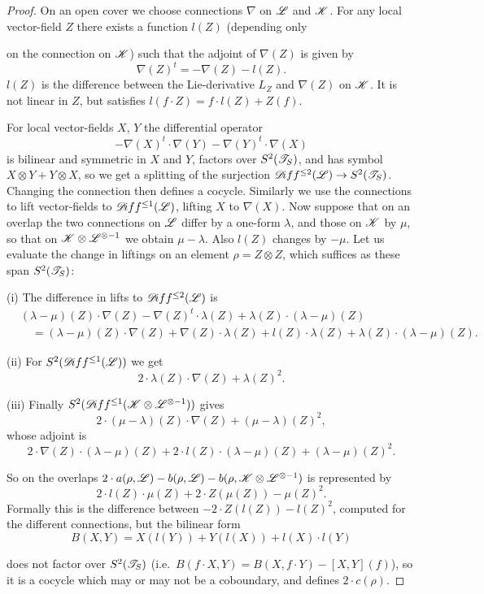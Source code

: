 \documentclass[12pt,english]{smfart}
\theoremstyle{plain} \newtheorem{innerthm}{Theorem} \newtheorem{innerlem}{Lemma} \newtheorem{innerprop}{Proposition} \newtheorem{innercor}{Corollary} \theoremstyle{definition} \newtheorem{innerdefn}{Definition} \newtheorem{innerconstr}{Construction} \theoremstyle{remark} \newtheorem*{remark}{Remark} \newtheorem*{remarks}{Remarks} \newtheorem*{applications}{Applications}
\begin{document}
\begin{proof}
On an open cover we choose connections $\nabla$ on $\mathscr{L}$ and $\mathscr{K}$. For any local vector-field $Z$ there exists a function $l(Z)$ (depending only


on the connection on $\mathscr{K}$) such that the adjoint of $\nabla(Z)$ is given by
\[
\nabla(Z)^t=-\nabla(Z)-l(Z).
\]
$l(Z)$ is the difference between the Lie-derivative $L_Z$ and $\nabla(Z)$ on $\mathscr{K}$. It is not linear in $Z$, but satisfies $l(f\cdot Z)=f\cdot l(Z)+Z(f)$.

For local vector-fields $X$, $Y$ the differential operator
\[
-\nabla(X)^t\cdot\nabla(Y)-\nabla(Y)^t\cdot\nabla(X)
\]
is bilinear and symmetric in $X$ and $Y$, factors over $S^2(\mathscr{T}_S)$, and has symbol $X\otimes Y+Y\otimes X$, so we get a splitting of the surjection $\mathscr{D}\!iff^{\le 2}(\mathscr{L})\to S^2(\mathscr{T}_S)$. Changing the connection then defines a cocycle. Similarly we use the connections to lift vector-fields to $\mathscr{D}\!iff^{\le 1}(\mathscr{L})$, lifting $X$ to $\nabla(X)$. Now suppose that on an overlap the two connections on $\mathscr{L}$ differ by a one-form $\lambda$, and those on $\mathscr{K}$ by $\mu$, so that on $\mathscr{K}\otimes\mathscr{L}^{\otimes-1}$ we obtain $\mu-\lambda$. Also $l(Z)$ changes by $-\mu$. Let us evaluate the change in liftings on an element $\rho=Z\otimes Z$, which suffices as these span $S^2(\mathscr{T}_S)$:

(i) The difference in lifts to $\mathscr{D}\!iff^{\le 2}(\mathscr{L})$ is
\begin{align*}
&(\lambda-\mu)(Z)\cdot\nabla(Z)-\nabla(Z)^t\cdot\lambda(Z)
+\lambda(Z)\cdot(\lambda-\mu)(Z)\\
&\quad=(\lambda-\mu)(Z)\cdot\nabla(Z)+\nabla(Z)\cdot\lambda(Z)
+l(Z)\cdot\lambda(Z)+\lambda(Z)\cdot(\lambda-\mu)(Z).
\end{align*}

(ii) For $S^2(\mathscr{D}\!iff^{\le 1}(\mathscr{L}))$ we get
\[
2\cdot\lambda(Z)\cdot\nabla(Z)+\lambda(Z)^2 .
\]

(iii) Finally $S^2(\mathscr{D}\!iff^{\le 1}(\mathscr{K}\otimes\mathscr{L}^{\otimes-1}))$ gives
\[
2\cdot(\mu-\lambda)(Z)\cdot\nabla(Z)+(\mu-\lambda)(Z)^2,
\]
whose adjoint is
\[
2\cdot\nabla(Z)\cdot(\lambda-\mu)(Z)+2\cdot l(Z)\cdot(\lambda-\mu)(Z)
+(\lambda-\mu)(Z)^2 .
\]

So on the overlaps $2\cdot a(\rho,\mathscr{L})-b(\rho,\mathscr{L}) -b(\rho,\mathscr{K}\otimes\mathscr{L}^{\otimes-1})$ is represented by
\[
2\cdot l(Z)\cdot\mu(Z)+2\cdot Z(\mu(Z))-\mu(Z)^2 .
\]
Formally this is the difference between $-2\cdot Z(l(Z))-l(Z)^2$, computed for the different connections, but the bilinear form
\[
B(X,Y)=X(l(Y))+Y(l(X))+l(X)\cdot l(Y)
\]


does not factor over $S^2(\mathscr{T}_S)$ (i.e.\ $B(f\cdot X,Y)=B(X,f\cdot Y)-[X,Y](f)$), so it is a cocycle which may or may not be a coboundary, and defines $2\cdot c(\rho)$.
\end{proof}
\end{document}
